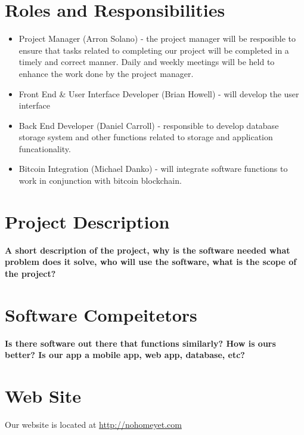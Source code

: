 \documentclass[12pt]{article}
\begin{document}
  

  \tableofcontents
  \listoffigures

  \clearpage

  \setcounter{page}{1}

  \section{Roles and Responsibilities}
  \begin{adjustwidth}{1.5em}{0pt}
    \begin{itemize}
      \item Project Manager (Arron Solano) - the project manager will be resposible to ensure that tasks related to completing our project will be completed in a timely and correct manner. Daily and weekly meetings will be held to enhance the work done by the project manager.
      \item Front End \& User Interface Developer (Brian Howell) - will develop the user interface 
      \item Back End Developer (Daniel Carroll) - responsible to develop database storage system and other functions related to storage and application funcationality.
       \item Bitcoin Integration (Michael Danko) - will integrate software functions to work in conjunction with bitcoin blockchain.
    \end{itemize}
    
\end{adjustwidth}

  \section{Project Description}
  \begin{adjustwidth}{1.5em}{0pt}

  \normalsize{\textbf{A short description of the project, why is the software needed what problem does it solve, who will use the software, what is the scope of the project?}}\\ 

  \end{adjustwidth}

  \section{Software Compeitetors}

  \normalsize{\textbf{Is there software out there that functions similarly? How is ours better? Is our app a mobile app, web app, database, etc?}}\\ 


  \section{Web Site}
  Our website is located at \url{http://nohomeyet.com}
\end{document}
